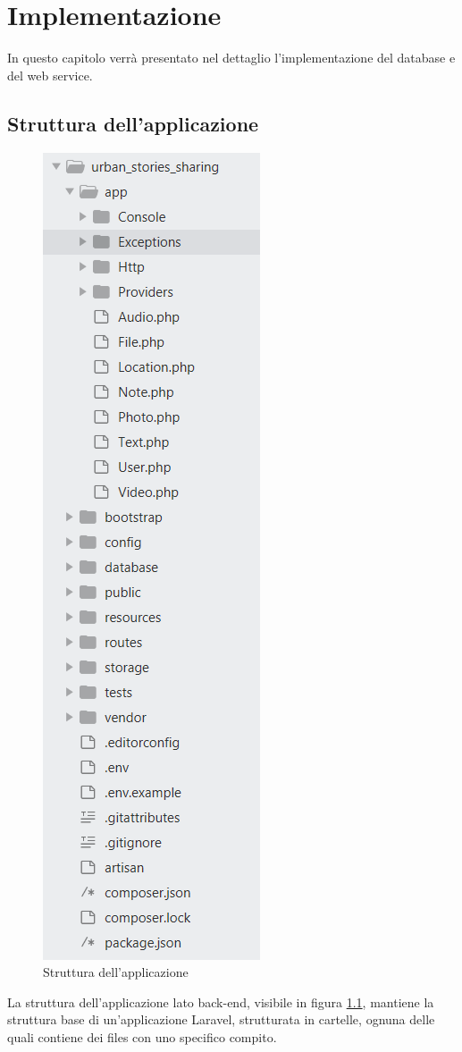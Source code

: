 \chapter{Implementazione}
\vspace{-10px}
In questo capitolo verrà presentato nel dettaglio l'implementazione del database e del web service.

\section{Struttura dell'applicazione}

\begin{figure}[H]
	\centering
	\includegraphics[width=0.2\linewidth, height=0.4\textheight]{Struttura_applicazione}
	\caption{Struttura dell'applicazione}
	\label{fig:AppStructure}
\end{figure}


La struttura dell'applicazione lato back-end, visibile in figura \ref{fig:AppStructure}, mantiene la struttura base di un'applicazione Laravel, strutturata in cartelle, ognuna delle quali contiene dei files con uno specifico compito.

